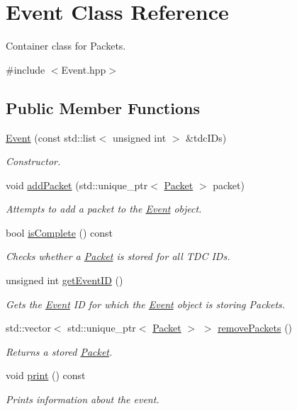 \hypertarget{class_event}{}\section{Event Class Reference}
\label{class_event}


Container class for Packets.  




{\ttfamily \#include $<$Event.\+hpp$>$}

\subsection*{Public Member Functions}
\begin{DoxyCompactItemize}
\item 
\hyperlink{class_event_a6e0319cd5e7b0e8b232e3c829c2ad00c}{Event} (const std\+::list$<$ unsigned int $>$ \&tdc\+I\+Ds)
\begin{DoxyCompactList}\small\item\em Constructor. \end{DoxyCompactList}\item 
void \hyperlink{class_event_a08c4689086126f702d3b14be99461c98}{add\+Packet} (std\+::unique\+\_\+ptr$<$ \hyperlink{class_packet}{Packet} $>$ packet)
\begin{DoxyCompactList}\small\item\em Attempts to add a packet to the \hyperlink{class_event}{Event} object. \end{DoxyCompactList}\item 
bool \hyperlink{class_event_a2a00b2c0c579397ac93c834cf987cbd9}{is\+Complete} () const
\begin{DoxyCompactList}\small\item\em Checks whether a \hyperlink{class_packet}{Packet} is stored for all T\+DC I\+Ds. \end{DoxyCompactList}\item 
unsigned int \hyperlink{class_event_a3f48bec589c70aa0d36fd5cb253ad88c}{get\+Event\+ID} ()
\begin{DoxyCompactList}\small\item\em Gets the \hyperlink{class_event}{Event} ID for which the \hyperlink{class_event}{Event} object is storing Packets. \end{DoxyCompactList}\item 
std\+::vector$<$ std\+::unique\+\_\+ptr$<$ \hyperlink{class_packet}{Packet} $>$ $>$ \hyperlink{class_event_a4a7c0f87ea9fd8526451d6eddc3a592e}{remove\+Packets} ()
\begin{DoxyCompactList}\small\item\em Returns a stored \hyperlink{class_packet}{Packet}. \end{DoxyCompactList}\item 
void \hyperlink{class_event_ab1b48a39a41a7fc92a25617adcf68aa8}{print} () const
\begin{DoxyCompactList}\small\item\em Prints information about the event. \end{DoxyCompactList}\end{DoxyCompactItemize}

